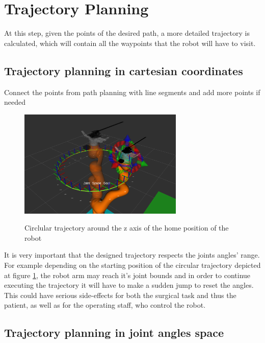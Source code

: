 \section{Trajectory Planning}

At this step, given the points of the desired path, a more detailed trajectory is calculated, 
which will contain all the waypoints that the robot will have to visit.

\subsection{Trajectory planning in cartesian coordinates}

Connect the points from path planning with line segments and add more points if needed

\begin{center}
\begin{figure}[H]
\centering
\includegraphics[width=0.7\textwidth]{images/simple_circular_traj1.png}\\
\caption{Circlular trajectory around the z axis of the home position of the robot}
\label{fig:circ-traj-out-of-angle-range}
\end{figure}
\end{center}

It is very important that the designed trajectory respects the joints angles' range. For example
depending on the starting position of the circular trajectory depicted at figure 
\ref{fig:circ-traj-out-of-angle-range}, the robot arm may reach it's joint bounds and in order to 
continue executing the trajectory it will have to make a sudden jump to reset the angles. 
This could have serious side-effects for both the surgical task and thus the patient, as well as 
for the operating staff, who control the robot.

\subsection{Trajectory planning in joint angles space}

